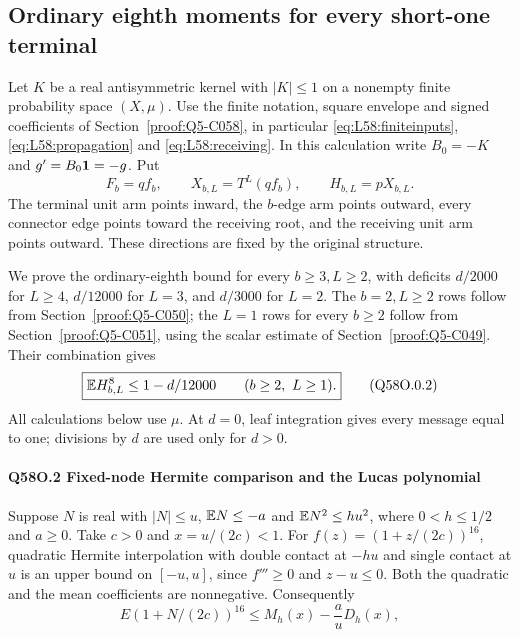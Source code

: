 \subsection{Ordinary eighth moments for every short-one terminal}\label{proof:Q5-C058-ordinary}
Let \(K\) be a real antisymmetric kernel with \(|K|\le\allowbreak 1\) on a nonempty finite probability space \((X,\allowbreak \mu)\). Use the finite notation, square envelope and signed coefficients of Section~\ref{proof:Q5-C058}, in particular \eqref{eq:L58:finiteinputs}, \eqref{eq:L58:propagation} and \eqref{eq:L58:receiving}. In this calculation write \(B_0=\allowbreak -K\) and \(g'=\allowbreak B_0\mathbf1=\allowbreak -g\). Put
\[
F_b=qf_b,\qquad X_{b,L}=T^L(qf_b),\qquad H_{b,L}=pX_{b,L}.
\tag{Q58O.0.1}\label{eq:Q58O:0.1}
\]
The terminal unit arm points inward, the \(b\)-edge arm points outward, every connector edge points toward the receiving root, and the receiving unit arm points outward. These directions are fixed by the original structure.

We prove the ordinary-eighth bound for every \(b\ge\allowbreak 3,\allowbreak L\ge\allowbreak 2\), with deficits \(d/2000\) for \(L\ge\allowbreak 4\), \(d/12000\) for \(L=\allowbreak 3\), and \(d/3000\) for \(L=\allowbreak 2\).
The \(b=\allowbreak 2,\allowbreak L\ge\allowbreak 2\) rows follow from Section~\ref{proof:Q5-C050}; the \(L=\allowbreak 1\) rows for every \(b\ge\allowbreak 2\) follow from Section~\ref{proof:Q5-C051}, using the scalar estimate of Section~\ref{proof:Q5-C049}. Their combination gives
\[
\boxed{\mathbb E H_{b,L}^8\le1-d/12000\qquad(b\ge2,\ L\ge1).}
\tag{Q58O.0.2}\label{eq:Q58O:0.2}
\]
All calculations below use \(\mu\). At \(d=\allowbreak 0\), leaf integration gives every message equal to one; divisions by \(d\) are used only for \(d>\allowbreak 0\).

\paragraph{Q58O.2 Fixed-node Hermite comparison and the Lucas polynomial}
Suppose \(N\) is real with \(|N|\le\allowbreak  u\), \(\mathbb E N\le\allowbreak -a\) and
\(\mathbb E N^2\le\allowbreak  hu^2\), where \(0<\allowbreak h\le\allowbreak 1/2\) and \(a\ge\allowbreak 0\).
Take \(c>\allowbreak 0\) and \(x=\allowbreak u/(2c)<\allowbreak 1\).
For \(f(z)=\allowbreak (1+z/(2c))^{16}\), quadratic Hermite interpolation with double contact at \(-hu\) and single contact at \(u\) is an upper bound on \([-u,\allowbreak u]\), since \(f'''\ge\allowbreak 0\) and \(z-u\le\allowbreak 0\).
Both the quadratic and the mean coefficients are nonnegative. Consequently
\[
E(1+N/(2c))^{16}\le M_h(x)-\frac a uD_h(x),
\tag{Q58O.2.1}\label{eq:Q58O:2.1}
\]

